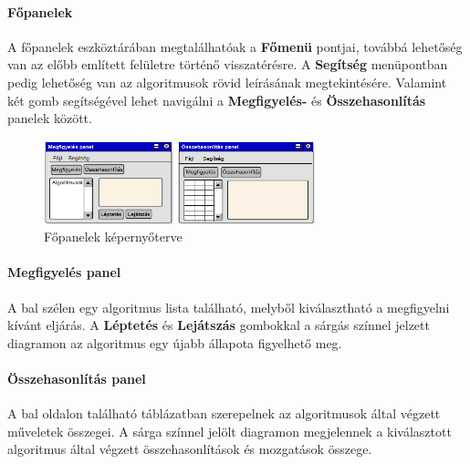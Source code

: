 \documentclass{elteikthesis}
\begin{document}
\paragraph{Főpanelek}
A főpanelek eszköztárában megtalálhatóak a \textbf{Főmenü} pontjai, továbbá lehetőség van az előbb említett felületre történő visszatérésre. A \textbf{Segítség} menüpontban pedig lehetőség van az algoritmusok rövid leírásának megtekintésére. Valamint két gomb segítségével lehet navigálni a \textbf{Megfigyelés-} és \textbf{Összehasonlítás} panelek között.
\begin{figure}[H]
	\centering
	\includegraphics[width=0.7\textwidth]{pics/plan_panels.png}
	\caption{Főpanelek képernyőterve}
\end{figure}\par
\paragraph{Megfigyelés panel}
A bal szélen egy algoritmus lista található, melyből kiválasztható a megfigyelni kívánt eljárás. A \textbf{Léptetés} és \textbf{Lejátszás} gombokkal a sárgás színnel jelzett diagramon az algoritmus egy újabb állapota figyelhető meg.
\paragraph{Összehasonlítás panel}
A bal oldalon található táblázatban szerepelnek az algoritmusok által végzett műveletek összegei. A sárga színnel jelölt diagramon megjelennek a kiválasztott algoritmus által végzett összehasonlítások és mozgatások összege.
\end{document}
